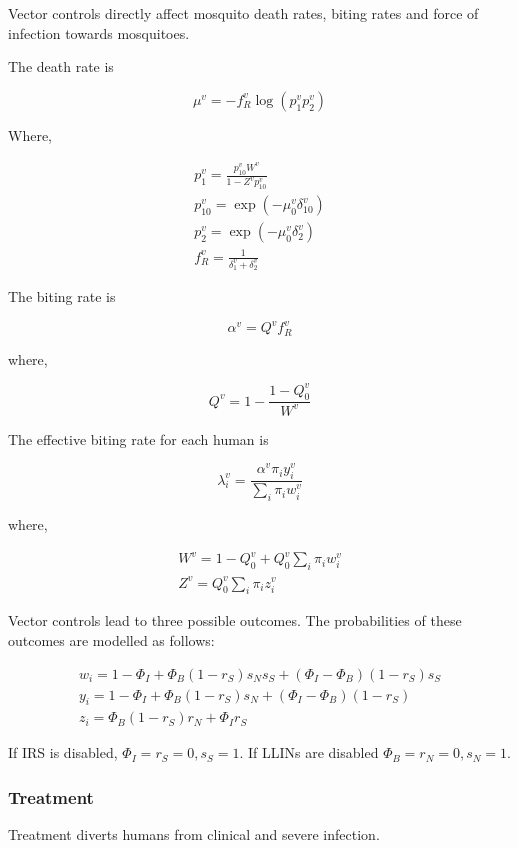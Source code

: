 \documentclass{bmcart}
\begin{document}
Vector controls directly affect mosquito death rates, biting rates and force of infection towards mosquitoes.

The death rate is

\[
\mu^v = -f_R^v \log(p_1^vp_2^v)
\]

Where,

\begin{gather*}
p_1^v = \frac{p_{10}^vW^v}{1 - Z^vp^v_{10}} \\
p_{10}^v = \exp(-\mu_0^v\delta^v_{10}) \\
p_2^v = \exp(-\mu_0^v\delta^v_2) \\
f_R^v = \frac{1}{\delta^v_1 + \delta^v_2}
\end{gather*}

The biting rate is

\[
\alpha^v = Q^v f^v_R
\]

where,

\[
Q^v = 1 - \frac{1 - Q_0^v}{W^v}
\]

The effective biting rate for each human is

\[
\lambda^v_i = \frac{\alpha^v\pi_iy^v_i}{\sum_i \pi_i w^v_i}
\]

where,

\begin{gather*}
    W^v = 1 - Q_0^v + Q_0^v \sum_i \pi_iw_i^v\\
    Z^v = Q_0^v \sum_i \pi_iz_i^v
\end{gather*}

Vector controls lead to three possible outcomes. The probabilities of these outcomes are modelled as follows:

\begin{gather*}
    w_i = 1 - \Phi_I + \Phi_B(1 -  r_S)s_Ns_S + (\Phi_I - \Phi_B)(1 - r_S)s_S\\
    y_i = 1 - \Phi_I + \Phi_B(1 -  r_S)s_N + (\Phi_I - \Phi_B)(1 - r_S)\\
    z_i = \Phi_B(1 - r_S)r_N + \Phi_Ir_S
\end{gather*}

If IRS is disabled, $\Phi_I = r_S = 0, s_S = 1$. If LLINs are disabled $\Phi_B = r_N = 0, s_N = 1$.

\subsubsection*{Treatment}

Treatment diverts humans from clinical and severe infection.
\end{document}
